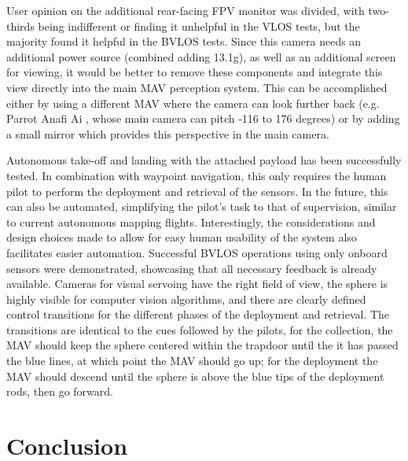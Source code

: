 User opinion on the additional rear-facing \ac{FPV} monitor was divided, with two-thirds being indifferent or finding it unhelpful in the \ac{VLOS} tests, but the majority found it helpful in the \ac{BVLOS} tests. Since this camera needs an additional power source (combined adding 13.1g), as well as an additional screen for viewing, it would be better to remove these components and integrate this view directly into the main \ac{MAV} perception system. This can be accomplished either by using a different \ac{MAV} where the camera can look further back (e.g. Parrot Anafi Ai \cite{ParrotWhitepaper}, whose main camera can pitch -116 to 176 degrees) or by adding a small mirror which provides this perspective in the main camera.

Autonomous take-off and landing with the attached payload has been successfully tested. In combination with waypoint navigation, this only requires the human pilot to perform the deployment and retrieval of the sensors. In the future, this can also be automated, simplifying the pilot's task to that of supervision, similar to current autonomous mapping flights. Interestingly, the considerations and design choices made to allow for easy human usability of the system also facilitates easier automation. Successful \ac{BVLOS} operations using only onboard sensors were demonstrated, showcasing that all necessary feedback is already available. Cameras for visual servoing have the right field of view, the sphere is highly visible for computer vision algorithms, and there are clearly defined control transitions for the different phases of the deployment and retrieval. The transitions are identical to the cues followed by the pilots, for the collection, the \ac{MAV} should keep the sphere centered within the trapdoor until the it has passed the blue lines, at which point the \ac{MAV} should go up; for the deployment the \ac{MAV} should descend until the sphere is above the blue tips of the deployment rods, then go forward. 

\section{Conclusion}

